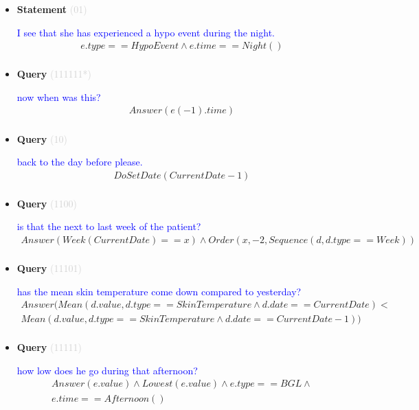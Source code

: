 \documentclass[11pt]{article}
\newcommand{\key}[1]{\textcolor{lightgray}{#1}}
\newcounter{CQuery}
\newcounter{CStatement}
\begin{document}
\begin{itemize}
\item
\textbf{Statement\theCStatement} \key{(01)} \addtocounter{CStatement}{1}
\textcolor{blue}{ I see that she has experienced a hypo event during the night. }
\begin{multline*}
e.type==HypoEvent \wedge e.time==Night() \\ 
\end{multline*}


\item
\textbf{Query\theCQuery} \key{(111111*)} \addtocounter{CQuery}{1}
\textcolor{blue}{ now when was this? }
\begin{multline*}
Answer(e(-1).time) \\ 
\end{multline*}


\item
\textbf{Query\theCQuery} \key{(10)} \addtocounter{CQuery}{1}
\textcolor{blue}{ back to the day before please. }
\begin{multline*}
DoSetDate(CurrentDate - 1) \\ 
\end{multline*}


\item
\textbf{Query\theCQuery} \key{(1100)} \addtocounter{CQuery}{1}
\textcolor{blue}{ is that the next to last week of the patient? }
\begin{multline*}
Answer(Week(CurrentDate)==x) \wedge Order(x, -2, Sequence(d, d.type==Week)) \\ 
\end{multline*}


\item
\textbf{Query\theCQuery} \key{(11101)} \addtocounter{CQuery}{1}
\textcolor{blue}{ has the mean skin temperature come down compared to yesterday? }
\begin{multline*}
Answer(Mean(d.value, d.type==SkinTemperature \wedge d.date==CurrentDate) < \\ 
Mean(d.value, d.type==SkinTemperature \wedge d.date==CurrentDate-1)) \\ 
\end{multline*}


\item
\textbf{Query\theCQuery} \key{(11111)} \addtocounter{CQuery}{1}
\textcolor{blue}{ how low does he go during that afternoon? }
\begin{multline*}
Answer(e.value) \wedge Lowest(e.value) \wedge e.type==BGL \wedge \\ 
e.time==Afternoon() \\ 
\end{multline*}



\end{itemize}
\end{document}
